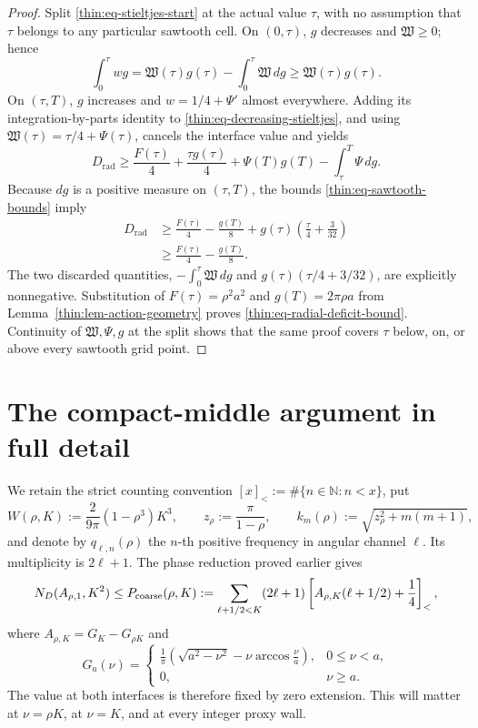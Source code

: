 \documentclass[11pt]{article}
\numberwithin{equation}{section}
\theoremstyle{definition}
\theoremstyle{remark}
\begin{document}
\begin{proof}
Split \eqref{thin:eq-stieltjes-start} at the actual value \(\tau\), with
no assumption that \(\tau\) belongs to any particular sawtooth cell.  On
\((0,\tau)\), \(g\) decreases and \(\mathfrak W\geq0\); hence
\begin{equation}
  \int_0^\tau wg
  =\mathfrak W(\tau)g(\tau)-\int_0^\tau \mathfrak W\,dg
  \geq \mathfrak W(\tau)g(\tau).
  \label{thin:eq-decreasing-stieltjes}
\end{equation}
On \((\tau,T)\), \(g\) increases and \(w=1/4+\Psi'\) almost everywhere.
Adding its integration-by-parts identity to
\eqref{thin:eq-decreasing-stieltjes}, and using
\(\mathfrak W(\tau)=\tau/4+\Psi(\tau)\), cancels the interface value and
yields
\[
  D_{\mathrm{rad}}
  \geq \frac{F(\tau)}4+\frac{\tau g(\tau)}4
     +\Psi(T)g(T)-\int_\tau^T\Psi\,dg.
\]
Because \(dg\) is a positive measure on \((\tau,T)\), the bounds
\eqref{thin:eq-sawtooth-bounds} imply
\[
\begin{aligned}
  D_{\mathrm{rad}}
  &\geq \frac{F(\tau)}4-\frac{g(T)}8
    +g(\tau)\left(\frac\tau4+\frac3{32}\right) \\
  &\geq \frac{F(\tau)}4-\frac{g(T)}8.
\end{aligned}
\]
The two discarded quantities,
\(-\int_0^\tau \mathfrak W\,dg\) and
\(g(\tau)(\tau/4+3/32)\), are explicitly nonnegative.  Substitution of
\(F(\tau)=\rho^2a^2\) and \(g(T)=2\pi\rho a\) from
Lemma~\ref{thin:lem-action-geometry} proves
\eqref{thin:eq-radial-deficit-bound}.  Continuity of
\(\mathfrak W,\Psi,g\) at the
split shows that the same proof covers \(\tau\) below, on, or above every
sawtooth grid point.
\end{proof}


\section{The compact-middle argument in full detail}
\label{cm:sec-full}

We retain the strict counting convention
\([x]_<:=\#\{n\in\mathbb N:n<x\}\), put
\[
 W(\rho,K):=\frac{2}{9\pi}(1-\rho^3)K^3,
 \qquad z_\rho:=\frac{\pi}{1-\rho},
 \qquad k_m(\rho):=\sqrt{z_\rho^2+m(m+1)},
\]
and denote by \(q_{\ell,n}(\rho)\) the \(n\)-th positive frequency in
angular channel \(\ell\).  Its multiplicity is \(2\ell+1\).  The phase
reduction proved earlier gives
\begin{equation}
 N_D(A_{\rho,1},K^2)
 \le P_{\rm coarse}(\rho,K)
 :=\sum_{\ell+1/2<K}(2\ell+1)
 \left[A_{\rho,K}(\ell+1/2)+\frac14\right]_<,
 \label{cm:eq-coarse}
\end{equation}
where \(A_{\rho,K}=G_K-G_{\rho K}\) and
\[
 G_a(\nu)=
 \begin{cases}
 \displaystyle\frac1\pi\left(\sqrt{a^2-\nu^2}
 -\nu\arccos\frac\nu a\right),&0\leq\nu<a,\\[4pt]
 0,&\nu\geq a.
 \end{cases}
\]
The value at both interfaces is therefore fixed by zero extension.  This
will matter at \(\nu=\rho K\), at \(\nu=K\), and at every integer proxy
wall.
\end{document}
